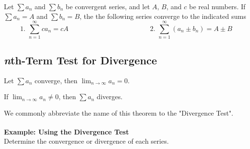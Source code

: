 \documentclass[addpoints, 12pt]{exam}
\begin{document}
\begin{tcolorbox}[title= PROPERTIES OF INFINITE SERIES,colframe=black,sharp corners,colback=white,colbacktitle=white,coltitle=black]

    Let $\displaystyle\sum a_n$ and $\displaystyle\sum b_n$ be convergent series, and let $A$, $B$, and $c$ be real numbers. If $\displaystyle\sum a_n=A$ and $\displaystyle\sum b_n=B$, the the following series converge to the indicated sums
    \[1.\, \, \sum_{n=1}^{\infty}ca_n=cA \hspace{2in}2.\, \, \sum_{n=1}^{\infty}\left(a_n\pm b_n\right)=A\pm B\]

\end{tcolorbox}

\newpage
{}
\subsection*{\textit{n}th-Term Test for Divergence}
\begin{tcolorbox}[title= LIMIT OF THE nTH TERM OF A SERIES,colframe=black,sharp corners,colback=white,colbacktitle=white,coltitle=black]

    \begin{center}
    Let $\displaystyle\sum a_n$ converge, then $\displaystyle\lim_{n\to\infty}a_n=0$.
    
    
    If $\displaystyle\lim_{n\to\infty}a_n\ne0$, then $\displaystyle\sum a_n$  diverges.
    \end{center}
    
\end{tcolorbox}
We commonly abbreviate the name of this theorem to the "Divergence Test".\\
\\
\noindent\textbf{Example: Using the Divergence Test}\\
Determine the convergence or divergence of each series.
\end{document}
